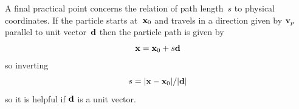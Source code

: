  
A final practical point concerns the relation of path length~$s$ to physical coordinates.
If the particle starts at~${\bf x}_0$ and travels in a direction
given by ${\bf v}_p$ parallel to unit vector~${\bf d}$ then the particle path is given by
\begin{equation}\label{eq:patheq}
{\bf x} = {\bf x}_0 + s {\bf d}
\end{equation}
so inverting
\begin{equation}\label{eq:zpatheq}
s = |{\bf x}-{\bf x}_0|/|{\bf d}|
\end{equation}
so it is helpful if ${\bf d}$ is a unit vector.
